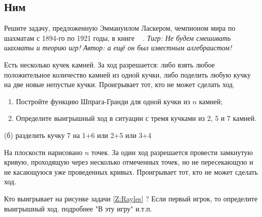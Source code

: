 \subsection{Ним}





\begin{problem}
Решите задачу, предложенную Эммануилом Ласкером, чемпионом мира по шахматам с 1894-го по 1921 годы, в книге ~\cite{Lasker} . {\it Тигр: Не будем смешивать шахматы и теорию игр! Автор: а ещё он был известным алгебраистом!}\par
Есть несколько кучек камней. За ход разрешается: либо взять любое положительное количество камней из одной кучки, либо поделить любую кучку на две новые непустые кучки. Проигрывает тот, кто не может сделать ход.\par
\begin{enumerate}
\item 	Постройте функцию Шпрага-Гранди для одной кучки из  $n$  камней;\par
\item 	Определите выигрышный ход в ситуации с тремя кучками из 2, 5 и 7 камней.\par
\end{enumerate}


\begin{sol}
(б) разделить кучку 7 на 1+6 или 2+5 или 3+4
\end{sol}
\end{problem}



\begin{problem}[Rim.]
На плоскости нарисовано  $n$  точек. За один ход разрешается провести замкнутую кривую, проходящую через несколько отмеченных точек, но не пересекающую и не касающуюся уже проведенных кривых. Проигрывает тот, кто не может сделать ход.\par
Кто выигрывает на рисунке задачи \ref{Z:Rayles} ? Если первый игрок, то определите выигрышный ход. {\red подробнее "В эту игру" и.т.п.}

\begin{sol}

\end{sol}
\end{problem}




